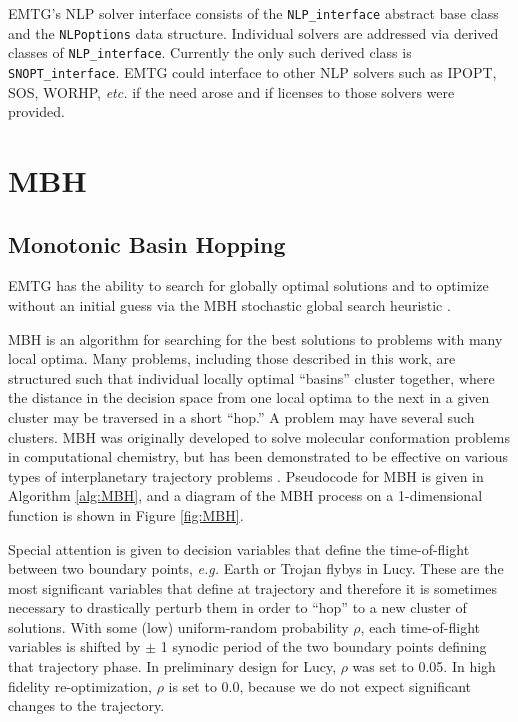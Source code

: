 \ac{EMTG}'s \ac{NLP} solver interface consists of the \texttt{NLP\_interface} abstract base class and the \texttt{NLPoptions} data structure. Individual solvers are addressed via derived classes of \texttt{NLP\_interface}. Currently the only such derived class is \texttt{SNOPT\_interface}. \ac{EMTG} could interface to other \ac{NLP} solvers such as IPOPT, SOS, WORHP, \textit{etc.} if the need arose and if licenses to those solvers were provided.

\section{\ac{MBH}}
\label{sec:MBH}

\subsection{Monotonic Basin Hopping}
\label{subsec:MBH}

\ac{EMTG} has the ability to search for globally optimal solutions and to optimize without an initial guess via the \ac{MBH} stochastic global search heuristic \cite{YamDiLorenzoIzzo2011,RaowulfCoverstonePareto,CoverstoneMicroGA,CoverstoneCarroll2000387,VavrinaHowellGAGALLOP,EnglanderConwayWilliamsEMTG,EnglanderConwayWilliamsEMTGLTConferencePaper,EnglanderPhD,EllisonEnglanderConwaySummer2013,EllisonEnglanderOzimekConwayWinter2014,MBH_ISSFD_2014,VavrinaMGAnDSMs}.

\ac{MBH} \cite{ISI:000165808600005} is an algorithm for searching for the best solutions to problems with many local optima. Many problems, including those described in this work, are structured such that individual locally optimal ``basins'' cluster together, where the distance in the decision space from one local optima to the next in a given cluster may be traversed in a short ``hop.'' A problem may have several such clusters. MBH was originally developed to solve molecular conformation problems in computational chemistry, but has been demonstrated to be effective on various types of interplanetary trajectory problems \cite{YamDiLorenzoIzzo2011,ISI:000288709500009,EnglanderConwayWilliamsEMTGLTConferencePaper, EnglanderPhD, EllisonEnglanderConwaySummer2013,ARRM_Option_C}. Pseudocode for \ac{MBH} is given in Algorithm \ref{alg:MBH}, and a diagram of the \ac{MBH} process on a 1-dimensional function is shown in Figure \ref{fig:MBH}.

Special attention is given to decision variables that define the time-of-flight between two boundary points, \textit{e.g.} Earth or Trojan flybys in Lucy. These are the most significant variables that define at trajectory and therefore it is sometimes necessary to drastically perturb them in order to ``hop'' to a new cluster of solutions. With some (low) uniform-random probability $\rho$, each time-of-flight variables is shifted by $\pm$ 1 synodic period of the two boundary points defining that trajectory phase. In preliminary design for Lucy, $\rho$ was set to 0.05. In high fidelity re-optimization, $\rho$ is set to 0.0, because we do not expect significant changes to the trajectory.

